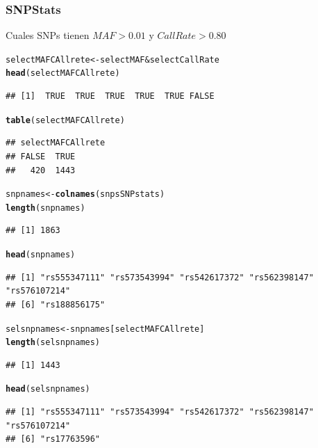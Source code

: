 \documentclass{beamer}\usepackage[]{graphicx}\usepackage[]{color}
\makeatletter
\newcommand{\hlopt}[1]{\textcolor[rgb]{0,0,0}{#1}}%
\newcommand{\hlstd}[1]{\textcolor[rgb]{0.345,0.345,0.345}{#1}}%
\newcommand{\hlkwb}[1]{\textcolor[rgb]{0.69,0.353,0.396}{#1}}%
\newcommand{\hlkwd}[1]{\textcolor[rgb]{0.737,0.353,0.396}{\textbf{#1}}}%
\newenvironment{kframe}{%
 \def\at@end@of@kframe{}%
 \ifinner\ifhmode%
  \def\at@end@of@kframe{\end{minipage}}%
  \begin{minipage}{\columnwidth}%
 \fi\fi%
 \def\FrameCommand##1{\hskip\@totalleftmargin \hskip-\fboxsep
 \colorbox{shadecolor}{##1}\hskip-\fboxsep
     \hskip-\linewidth \hskip-\@totalleftmargin \hskip\columnwidth}%
 \MakeFramed {\advance\hsize-\width
   \@totalleftmargin\z@ \linewidth\hsize
   \@setminipage}}%
 {\par\unskip\endMakeFramed%
 \at@end@of@kframe}
\newenvironment{knitrout}{}{} %
\makeatother
\begin{document}
\begin{frame}[fragile]
\frametitle{SNPStats}
Cuales SNPs tienen $MAF>0.01$ y $CallRate > 0.80$
\begin{knitrout}\footnotesize
{}\color{fgcolor}\begin{kframe}
\begin{alltt}
\hlstd{selectMAFCAllrete} \hlkwb{<-} \hlstd{selectMAF} \hlopt{&} \hlstd{selectCallRate}
\hlkwd{head}\hlstd{(selectMAFCAllrete)}
\end{alltt}
\begin{verbatim}
## [1]  TRUE  TRUE  TRUE  TRUE  TRUE FALSE
\end{verbatim}
\begin{alltt}
\hlkwd{table}\hlstd{(selectMAFCAllrete)}
\end{alltt}
\begin{verbatim}
## selectMAFCAllrete
## FALSE  TRUE 
##   420  1443
\end{verbatim}
\end{kframe}
\end{knitrout}

\begin{knitrout}\footnotesize
{}\color{fgcolor}\begin{kframe}
\begin{alltt}
\hlstd{snpnames} \hlkwb{<-} \hlkwd{colnames}\hlstd{(snpsSNPstats)}
\hlkwd{length}\hlstd{(snpnames)}
\end{alltt}
\begin{verbatim}
## [1] 1863
\end{verbatim}
\begin{alltt}
\hlkwd{head}\hlstd{(snpnames)}
\end{alltt}
\begin{verbatim}
## [1] "rs555347111" "rs573543994" "rs542617372" "rs562398147" "rs576107214"
## [6] "rs188856175"
\end{verbatim}
\begin{alltt}
\hlstd{selsnpnames} \hlkwb{<-} \hlstd{snpnames[selectMAFCAllrete]}
\hlkwd{length}\hlstd{(selsnpnames)}
\end{alltt}
\begin{verbatim}
## [1] 1443
\end{verbatim}
\begin{alltt}
\hlkwd{head}\hlstd{(selsnpnames)}
\end{alltt}
\begin{verbatim}
## [1] "rs555347111" "rs573543994" "rs542617372" "rs562398147" "rs576107214"
## [6] "rs17763596"
\end{verbatim}
\end{kframe}
\end{knitrout}
\end{frame}
\end{document}
